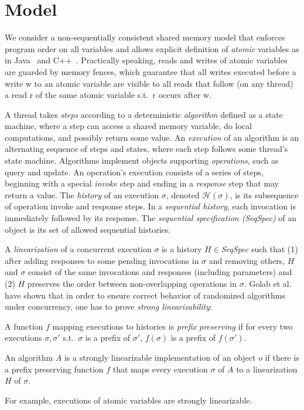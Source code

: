 \section{Model}
\label{fc-sec:model}

We consider a non-sequentially consistent shared memory model that enforces program order on all variables and allows explicit 
definition of \emph{atomic} variables as in Java~\cite{JavaMemoryModel} and C++~\cite{CppConcurrentMemoryModel}.
Practically speaking, reads and writes of atomic variables are guarded by memory fences, which guarantee
that all writes executed before a write {\sc w} to an atomic variable are visible to all
reads that follow (on any thread) a read {\sc r} of the same atomic variable s.t.\ {\sc r} occurs after {\sc w}. 


A thread takes \emph{steps} according to a deterministic \emph{algorithm} defined as a state machine, 
where a step can access a shared memory variable, do local computations, and possibly return some value.
An \emph{execution} of an algorithm is an alternating sequence of steps and states, where  each step follows some thread's state machine.
Algorithms implement objects supporting \emph{operations}, such as query and update. 
An operation's execution consists of a series of steps, beginning with a special \emph{invoke} step and ending in a \emph{response}
step that may return a value. 
The \emph{history} of an execution $\sigma$, denoted ${\mathcal{H}}(\sigma)$, 
is its subsequence of operation invoke and response steps.
In a \emph{sequential history}, each invocation is immediately followed by its response.
The \emph{sequential specification (SeqSpec)} of an object is its set of allowed sequential histories.

A \emph{linearization} of a concurrent execution $\sigma$ is a history $H \in$\emph{SeqSpec}
such that (1) after adding responses to some pending invocations in $\sigma$ and removing others,
$H$ and $\sigma$ consist of the same invocations and responses (including parameters)
and (2) $H$ preserves the order between non-overlapping operations in $\sigma$.
Golab et al.~\cite{Wojciech} have shown that in order to ensure
correct behavior of randomized algorithms under concurrency,
one has to prove \emph{strong linearizability}:

\begin{definition}
A function $f$ mapping executions to  histories is \emph{prefix preserving} if
for every  two executions $\sigma, \sigma'$ s.t.\ $\sigma$ is a prefix of $\sigma'$,  
$f(\sigma)$ is a prefix of $f(\sigma')$.

An algorithm $A$ is a strongly linearizable implementation of an 
object $o$ if there is a prefix preserving function $f$ that maps 
every execution $\sigma$ of $A$ to a linearization $H$ of $\sigma$.
\end{definition}

For example, executions of atomic variables are strongly linearizable.
